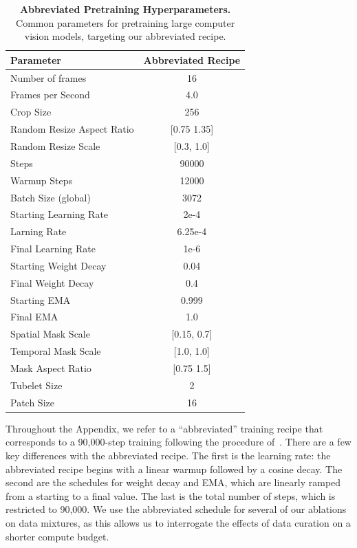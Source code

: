 \documentclass[]{kling/kling}
\begin{document}
\begin{table}[h]
    \small
    \caption{\small{\bf Abbreviated Pretraining Hyperparameters.} Common parameters for pretraining large computer vision models, targeting our abbreviated recipe.}
    \centering
    \label{tab:abbreviated_pretraining_params}
    \begin{tabular}{l c}
      \bf Parameter & \bf Abbreviated Recipe \\
        \toprule
        Number of frames & 16 \\
        Frames per Second & 4.0 \\
        Crop Size & 256 \\
        Random Resize Aspect Ratio & [0.75 1.35] \\
        Random Resize Scale & [0.3, 1.0] \\
        Steps & 90000 \\
        Warmup Steps & 12000 \\
        Batch Size (global) & 3072 \\
        Starting Learning Rate & 2e-4 \\
        Larning Rate & 6.25e-4 \\
        Final Learning Rate & 1e-6 \\
        Starting Weight Decay & 0.04 \\
        Final Weight Decay & 0.4 \\
        Starting EMA & 0.999 \\
        Final EMA & 1.0 \\
        Spatial Mask Scale & [0.15, 0.7] \\
        Temporal Mask Scale & [1.0, 1.0] \\
        Mask Aspect Ratio & [0.75 1.5] \\
        Tubelet Size & 2 \\
        Patch Size & 16 \\
        \bottomrule
    \end{tabular}
\end{table}
Throughout the Appendix, we refer to a ``abbreviated'' training recipe that corresponds to a 90,000-step training following the procedure of~\citet{bardes2024revisiting}.
There are a few key differences with the abbreviated recipe.
The first is the learning rate: the abbreviated recipe begins with a linear warmup followed by a cosine decay.
The second are the schedules for weight decay and EMA, which are linearly ramped from a starting to a final value.
The last is the total number of steps, which is restricted to 90,000.
We use the abbreviated schedule for several of our ablations on data mixtures, as this allows us to interrogate the effects of data curation on a shorter compute budget.
\end{document}
